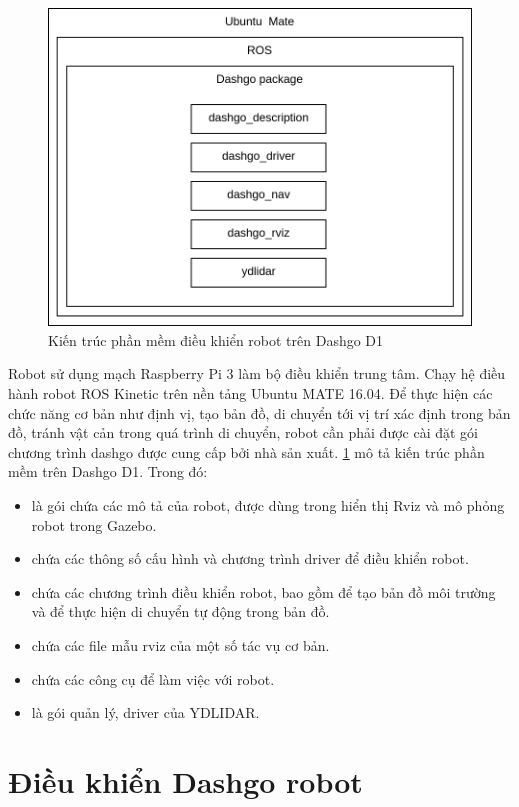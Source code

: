 \begin{figure}[htbp]
    \centering
    \includegraphics[width=0.7\linewidth]{figures/dashgo-architecture.png}
    \caption{Kiến trúc phần mềm điều khiển robot trên Dashgo D1}
    \label{fig:dashgo-architecture}
\end{figure}

Robot sử dụng mạch Raspberry Pi 3 làm bộ điều khiển trung tâm. Chạy hệ điều hành robot ROS Kinetic trên nền tảng Ubuntu MATE 16.04. Để thực hiện các chức năng cơ bản như định vị, tạo bản đồ, di chuyển tới vị trí xác định trong bản đồ, tránh vật cản trong quá trình di chuyển, robot cần phải được cài đặt gói chương trình dashgo được cung cấp bởi nhà sản xuất.
\figurename{ \ref{fig:dashgo-architecture}} mô tả kiến trúc phần mềm trên Dashgo D1. Trong đó:
\begin{itemize}
    \item {} là gói chứa các mô tả của robot, được dùng trong hiển thị Rviz và mô phỏng robot trong Gazebo.
    \item {} chứa các thông số cấu hình và chương trình driver để điều khiển robot.
    \item {} chứa các chương trình điều khiển robot, bao gồm  để tạo bản đồ môi trường và  để thực hiện di chuyển tự động trong bản đồ.
    \item {} chứa các file mẫu rviz của một số tác vụ cơ bản.
    \item {} chứa các công cụ để làm việc với robot.
    \item {} là gói quản lý, driver của YDLIDAR.
\end{itemize}

\section{Điều khiển Dashgo robot}

